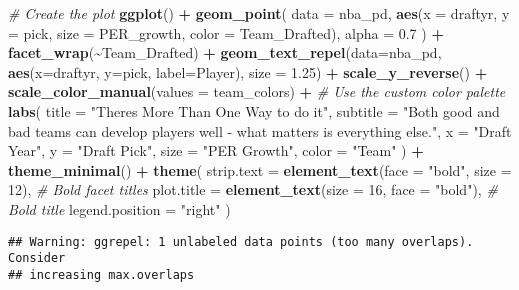 \documentclass[
]{article}
\newenvironment{Shaded}{\begin{snugshade}}{\end{snugshade}}
\newcommand{\AttributeTok}[1]{\textcolor[rgb]{0.13,0.29,0.53}{#1}}
\newcommand{\CommentTok}[1]{\textcolor[rgb]{0.56,0.35,0.01}{\textit{#1}}}
\newcommand{\DecValTok}[1]{\textcolor[rgb]{0.00,0.00,0.81}{#1}}
\newcommand{\FloatTok}[1]{\textcolor[rgb]{0.00,0.00,0.81}{#1}}
\newcommand{\FunctionTok}[1]{\textcolor[rgb]{0.13,0.29,0.53}{\textbf{#1}}}
\newcommand{\NormalTok}[1]{#1}
\newcommand{\SpecialCharTok}[1]{\textcolor[rgb]{0.81,0.36,0.00}{\textbf{#1}}}
\newcommand{\StringTok}[1]{\textcolor[rgb]{0.31,0.60,0.02}{#1}}
\begin{document}
\begin{Shaded}
\begin{Highlighting}[]
\CommentTok{\# Create the plot}
\FunctionTok{ggplot}\NormalTok{() }\SpecialCharTok{+} 
  \FunctionTok{geom\_point}\NormalTok{(}
    \AttributeTok{data =}\NormalTok{ nba\_pd, }
    \FunctionTok{aes}\NormalTok{(}\AttributeTok{x =}\NormalTok{ draftyr, }\AttributeTok{y =}\NormalTok{ pick, }\AttributeTok{size =}\NormalTok{ PER\_growth, }\AttributeTok{color =}\NormalTok{ Team\_Drafted), }
    \AttributeTok{alpha =} \FloatTok{0.7}
\NormalTok{  ) }\SpecialCharTok{+}
  \FunctionTok{facet\_wrap}\NormalTok{(}\SpecialCharTok{\textasciitilde{}}\NormalTok{Team\_Drafted) }\SpecialCharTok{+}
  \FunctionTok{geom\_text\_repel}\NormalTok{(}\AttributeTok{data=}\NormalTok{nba\_pd, }
    \FunctionTok{aes}\NormalTok{(}\AttributeTok{x=}\NormalTok{draftyr, }\AttributeTok{y=}\NormalTok{pick, }\AttributeTok{label=}\NormalTok{Player), }\AttributeTok{size =} \FloatTok{1.25}\NormalTok{) }\SpecialCharTok{+}
  \FunctionTok{scale\_y\_reverse}\NormalTok{() }\SpecialCharTok{+}
  \FunctionTok{scale\_color\_manual}\NormalTok{(}\AttributeTok{values =}\NormalTok{ team\_colors) }\SpecialCharTok{+}  \CommentTok{\# Use the custom color palette}
  \FunctionTok{labs}\NormalTok{(}
    \AttributeTok{title =} \StringTok{"There\textquotesingle{}s More Than One Way to do it"}\NormalTok{,}
    \AttributeTok{subtitle =} \StringTok{"Both good and bad teams can develop players well {-} what matters is everything else."}\NormalTok{,}
    \AttributeTok{x =} \StringTok{"Draft Year"}\NormalTok{,}
    \AttributeTok{y =} \StringTok{"Draft Pick"}\NormalTok{,}
    \AttributeTok{size =} \StringTok{"PER Growth"}\NormalTok{,}
    \AttributeTok{color =} \StringTok{"Team"}
\NormalTok{  ) }\SpecialCharTok{+}
  \FunctionTok{theme\_minimal}\NormalTok{() }\SpecialCharTok{+}
  \FunctionTok{theme}\NormalTok{(}
    \AttributeTok{strip.text =} \FunctionTok{element\_text}\NormalTok{(}\AttributeTok{face =} \StringTok{"bold"}\NormalTok{, }\AttributeTok{size =} \DecValTok{12}\NormalTok{),  }\CommentTok{\# Bold facet titles}
    \AttributeTok{plot.title =} \FunctionTok{element\_text}\NormalTok{(}\AttributeTok{size =} \DecValTok{16}\NormalTok{, }\AttributeTok{face =} \StringTok{"bold"}\NormalTok{),  }\CommentTok{\# Bold title}
    \AttributeTok{legend.position =} \StringTok{"right"}
\NormalTok{  )}
\end{Highlighting}
\end{Shaded}

\begin{verbatim}
## Warning: ggrepel: 1 unlabeled data points (too many overlaps). Consider
## increasing max.overlaps
\end{verbatim}
\end{document}
